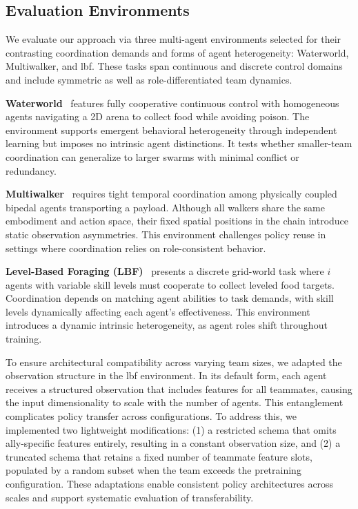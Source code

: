 \documentclass{article}
\begin{document}
\subsection{Evaluation Environments} 

We evaluate our approach via three multi-agent environments selected for their contrasting 
coordination demands and forms of agent heterogeneity: 
Waterworld, Multiwalker, and \gls{lbf}. These tasks span continuous 
and discrete control domains and include symmetric as well as role-differentiated team dynamics.

\textbf{Waterworld}~\cite{gupta2017} features fully cooperative continuous control 
with homogeneous agents navigating a 2D arena to collect food while avoiding poison. 
The environment supports emergent behavioral heterogeneity through independent learning 
but imposes no intrinsic agent distinctions. It tests whether smaller-team coordination 
can generalize to larger swarms with minimal conflict or redundancy.

\textbf{Multiwalker}~\cite{gupta2017} requires tight temporal coordination among physically 
coupled bipedal agents transporting a payload. Although all walkers share the same embodiment 
and action space, their fixed spatial positions in the chain introduce static observation 
asymmetries. This environment challenges policy reuse in settings where coordination relies 
on role-consistent behavior.

\textbf{Level-Based Foraging (LBF)}~\cite{papoudakis2021} presents a discrete grid-world task 
where \(i\) agents with variable skill levels must cooperate to collect leveled food targets. 
Coordination depends on matching agent abilities to task demands, with skill levels 
dynamically affecting each agent's effectiveness. This environment introduces a dynamic 
intrinsic heterogeneity, as agent roles shift throughout training.

To ensure architectural compatibility across varying team sizes, we adapted the observation 
structure in the \gls{lbf} environment. In its default form, 
each agent receives a structured observation that includes features for all teammates, 
causing the input dimensionality to scale with the number of agents. 
This entanglement complicates policy transfer across configurations. 
To address this, we implemented two lightweight modifications: 
(1) a restricted schema that omits ally-specific features entirely, 
resulting in a constant observation size, and 
(2) a truncated schema that retains a fixed number of teammate feature slots, 
populated by a random subset when the team exceeds the pretraining configuration. 
These adaptations enable consistent policy architectures across scales and support 
systematic evaluation of transferability.
\end{document}
